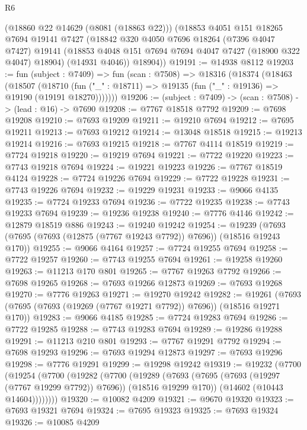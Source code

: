 \begin{lexlean}{R6}
\begin{coremodule}
      (@18860 @22 @14629 (@8081 (@18863 @22)))
      (@18853
        @4051
        @151
        @18265
        @7694
        @19141
        @7427
        (@18842
          @320
          @4050
          @7696
          @18264
          (@7396 @4047 @7427)
          @19141
          (@18853 @4048 @151 @7694 @7694 @4047 @7427 (@18900 @322 @4047) @18904)
          (@14931 @4046))
        @18904))
@19191 := @14938 @8112
@19203 := fun (subject : @7409) =>
  fun (scan : @7508) =>
  @18316
    (@18374
      (@18463
        (@18507
          (@18710 (fun ("_" : @18711) => @19135 (fun ("_" : @19136) => @19190 (@19191 @18270)))))))
@19206 := (subject : @7409) -> (scan : @7508) -> (lead : @16) -> @7690
@19208 := @7767 @18518 @7792
@19209 := @7698 @19208
@19210 := @7693 @19209
@19211 := @19210 @7694
@19212 := @7695 @19211
@19213 := @7693 @19212
@19214 := @13048 @18518
@19215 := @19213 @19214
@19216 := @7693 @19215
@19218 := @7767 @4114 @18519
@19219 := @7724 @19218
@19220 := @19219 @7694
@19221 := @7722 @19220
@19223 := @7743 @19218 @7694
@19224 := @19221 @19223
@19226 := @7767 @18519 @4124
@19228 := @7724 @19226 @7694
@19229 := @7722 @19228
@19231 := @7743 @19226 @7694
@19232 := @19229 @19231
@19233 := @9066 @4135
@19235 := @7724 @19233 @7694
@19236 := @7722 @19235
@19238 := @7743 @19233 @7694
@19239 := @19236 @19238
@19240 := @7776 @4146
@19242 := @12879 @18519 @886
@19243 := @19240 @19242
@19254 := @19239 (@7693 (@7695 (@7693 (@12875 (@7767 @19243 @7792)) @7696)) (@18516 @19243 @170))
@19255 := @9066 @4164
@19257 := @7724 @19255 @7694
@19258 := @7722 @19257
@19260 := @7743 @19255 @7694
@19261 := @19258 @19260
@19263 := @11213 @170 @801
@19265 := @7767 @19263 @7792
@19266 := @7698 @19265
@19268 := @7693 @19266 @12873
@19269 := @7693 @19268
@19270 := @7776 @19263
@19271 := @19270 @19242
@19282 := @19261 (@7693 (@7695 (@7693 (@19269 (@7767 @19271 @7792)) @7696)) (@18516 @19271 @170))
@19283 := @9066 @4185
@19285 := @7724 @19283 @7694
@19286 := @7722 @19285
@19288 := @7743 @19283 @7694
@19289 := @19286 @19288
@19291 := @11213 @210 @801
@19293 := @7767 @19291 @7792
@19294 := @7698 @19293
@19296 := @7693 @19294 @12873
@19297 := @7693 @19296
@19298 := @7776 @19291
@19299 := @19298 @19242
@19319 := @19232
    (@7700
      (@19254
        (@7700
          (@19282
            (@7700
              (@19289
                (@7693 (@7695 (@7693 (@19297 (@7767 @19299 @7792)) @7696)) (@18516 @19299 @170))
                (@14602 (@10443 @14604))))))))
@19320 := @10082 @4209
@19321 := @9670 @19320
@19323 := @7693 @19321 @7694
@19324 := @7695 @19323
@19325 := @7693 @19324
@19326 := @10085 @4209

\end{coremodule}
\end{lexlean}
